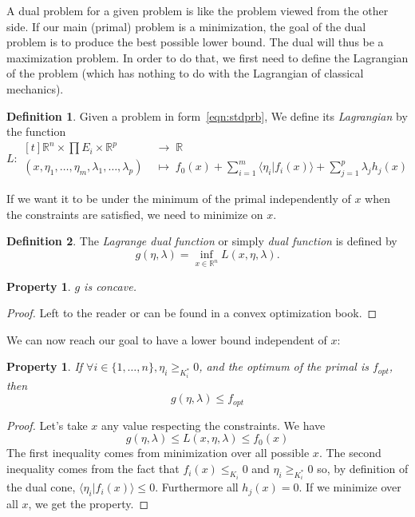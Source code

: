\documentclass[10pt,a4paper]{report}
\theoremstyle{plain}
\newtheorem{prop}[thm]{Property}
\theoremstyle{definition}
\newtheorem{defn}{Definition}[chapter]
\theoremstyle{remark}
\newcommand{\R}{\ensuremath{\mathbb{R}}}
\newcommand{\braket}[2]{\langle#1|#2\rangle}
\renewcommand{\geq}{\geqslant}
\renewcommand{\leq}{\leqslant}
\begin{document}
A dual problem for a given problem is like the problem viewed from the other
side. If our main (primal) problem is a minimization, the goal of the dual
problem is to produce the best possible lower bound. The dual will thus be a
maximization problem. In order to do that, we first
need to define the Lagrangian of the problem (which has nothing to do with the
Lagrangian of classical mechanics).

\begin{defn}
  Given a problem in form~\ref{eqn:stdprb}, We define its \emph{Lagrangian} by
  the function
  \[ L:\begin{aligned}[t] \R^n \times \prod E_i \times \R^p \;&\to\; \R\\
      (x,\eta_1,\ldots,\eta_m,\lambda_1,\ldots,\lambda_p) \;&\mapsto\; f_0(x) +
      \sum_{i = 1}^m \braket {\eta_i}{f_i(x)} + \sum_{j = 1}^p \lambda_j h_j(x)
    \end{aligned}
  \]
\end{defn}


If we want it to be under the minimum of the primal independently of $x$ when the constraints are
satisfied, we need to minimize on $x$.

\begin{defn}
  The \emph{Lagrange dual function} or simply \emph{dual function} is defined by
  \[g(\eta,\lambda) = \inf_{x \in \R^n} L(x,\eta,\lambda).\]
\end{defn}

\begin{prop}
  $g$ is concave.
\end{prop}

\begin{proof}
  Left to the reader or can be found in a convex optimization book.
\end{proof}

We can now reach our goal to have a lower bound independent of $x$:

\begin{prop}
  If $\forall i \in \{1,\ldots,n\}, \eta_i \geq_{K_i^*} 0$, and the optimum of the primal is
  $f_{opt}$, then
  \[g(\eta,\lambda) \leq f_{opt}\]
\end{prop}

\begin{proof}
  Let's take $x$ any value respecting the constraints. We have
  \[g(\eta,\lambda) \le L(x,\eta,\lambda) \le f_0(x)\]
  The first inequality comes from minimization over all possible $x$.
  The second inequality comes from the fact that $f_i(x) \leq_{K_i} 0$ and
  $\eta_i \geq_{K_i^*} 0$ so, by definition of the dual cone, $\braket
  {\eta_i}{f_i(x)} \leq 0$. Furthermore all $h_j(x) = 0$. If we minimize over
  all $x$, we get the property.
\end{proof}
\end{document}
